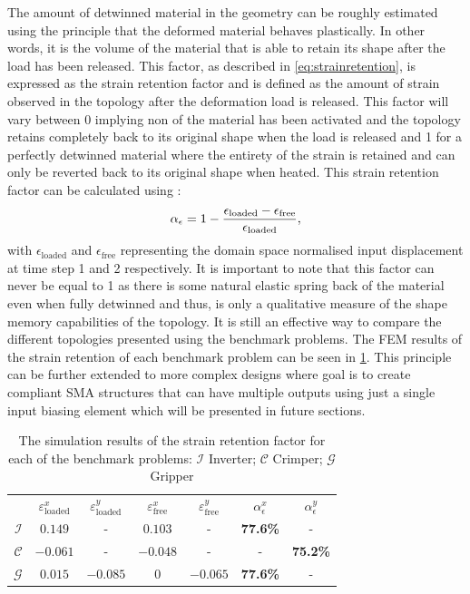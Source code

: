 The amount of detwinned material in the geometry can be roughly estimated using the principle that the deformed material behaves plastically. In other words, it is the volume of the material that is able to retain its shape after the load has been released. This factor, as described in \cref{eq:strainretention}, is expressed as the strain retention factor and is defined as the amount of strain observed in the topology after the deformation load is released. This factor will vary between 0 implying non of the material has been activated and the topology retains completely back to its original shape when the load is released and 1 for a perfectly detwinned material where the entirety of the strain is retained and can only be reverted back to its original shape when heated. This strain retention factor can be calculated using :
\begin{equation}
    \alpha_\epsilon = 1-\frac{\epsilon_\text{loaded}-\epsilon_\text{free}}{\epsilon_\text{loaded}},
    \label{eq:strainretention}
\end{equation}
with $\epsilon_\text{loaded}$ and $\epsilon_\text{free}$ representing the domain space normalised input displacement at time step 1 and 2 respectively. It is important to note that this factor can never be equal to 1 as there is some natural elastic spring back of the material even when fully detwinned and thus, is only a qualitative measure of the shape memory capabilities of the topology. It is still an effective way to compare the different topologies presented using the benchmark problems. The FEM results of the strain retention of each benchmark problem can be seen in \cref{tab:bm-fem-results}. This principle can be further extended to more complex designs where goal is to create compliant SMA structures that can have multiple outputs using just a single input biasing element which will be presented in future sections.
\begin{table}[hbt!]
    \centering
    \caption{The simulation results of the strain retention factor for each of the benchmark problems: $\boldsymbol{\mathcal{I}}$ Inverter; $\boldsymbol{\mathcal{C}}$ Crimper; $\boldsymbol{\mathcal{G}}$ Gripper}
    \label{tab:bm-fem-results}
    {
     \begin{tabular}{r c c c c c c}
     \rowcolor{black} & \textbf{\color{white} $\varepsilon_\text{loaded}^x$}  & \textbf{\color{white} $\varepsilon_\text{loaded}^y$}  & \textbf{\color{white} $\varepsilon_\text{free}^x$} & \textbf{\color{white} $\varepsilon_\text{free}^y$}  & \textbf{\color{white} $\alpha_\epsilon^x$}  & \textbf{\color{white} $\alpha_\epsilon^y$} \\
     $\boldsymbol{\mathcal{I}}$ & $0.149$ & - & $0.103$ & - & \textbf{77.6\%} & - \\
     $\boldsymbol{\mathcal{C}}$ & $-0.061$ & - & $-0.048$ & - & - & \textbf{75.2\%} \\
     $\boldsymbol{\mathcal{G}}$ & $0.015$ & $-0.085$ & $0$ & $-0.065$ & \textbf{77.6\%} & - \\
 \end{tabular}}
\end{table}
